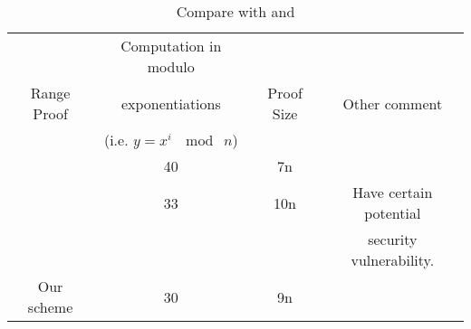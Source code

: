 \begin{table}[htbp]

\begin{center}%
\label{5-1}
\begin{adjustbox}{max width=1.1\textwidth}

\begin{tabular}[t]{|c|c|c|c|}
	\hline
	~&   Computation in modulo &~&~\\
	Range Proof&exponentiations &Proof Size&Other comment\\
	~&(i.e. $y = x^i~\mod~n$)&~&~\\
	\hline
	\cite{boudot2000efficient} &40& 7n& ~ \\
	\hline
	\cite{peng2010efficient}  &33&10n& Have certain potential \\
	~&~&~&security vulnerability. \\
	\hline
	Our scheme&30&9n&  \\
	\hline
\end{tabular}

\end{adjustbox}
\end{center}
\caption{Compare with \cite{boudot2000efficient} and \cite{peng2010efficient}}
\end{table}